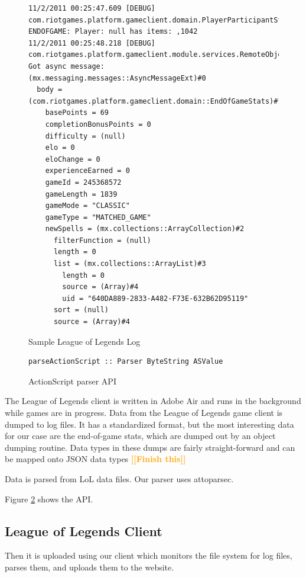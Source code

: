 \documentclass{chi2009}
\newcommand{\todo}[1]{\textsf{\textbf{\textcolor{Orange}{[[#1]]}}}}
\begin{document}
\begin{figure}[]
\begin{verbatim}
11/2/2011 00:25:47.609 [DEBUG] com.riotgames.platform.gameclient.domain.PlayerParticipantStatsSummary ENDOFGAME: Player: null has items: ,1042
11/2/2011 00:25:48.218 [DEBUG] com.riotgames.platform.gameclient.module.services.RemoteObjectGenerator Got async message: (mx.messaging.messages::AsyncMessageExt)#0
  body = (com.riotgames.platform.gameclient.domain::EndOfGameStats)#1
    basePoints = 69
    completionBonusPoints = 0
    difficulty = (null)
    elo = 0
    eloChange = 0
    experienceEarned = 0
    gameId = 245368572
    gameLength = 1839
    gameMode = "CLASSIC"
    gameType = "MATCHED_GAME"
    newSpells = (mx.collections::ArrayCollection)#2
      filterFunction = (null)
      length = 0
      list = (mx.collections::ArrayList)#3
        length = 0
        source = (Array)#4
        uid = "640DA889-2833-A482-F73E-632B62D95119"
      sort = (null)
      source = (Array)#4
\end{verbatim}
    \caption{Sample League of Legends Log}
    \label{samplelog}
\end{figure}

\begin{figure}[]
\begin{verbatim}
parseActionScript :: Parser ByteString ASValue
\end{verbatim}
    \caption{ActionScript parser API}
    \label{asapi}
\end{figure}

The League of Legends client is written in Adobe Air and runs in the background while games are in progress. Data from the League of Legends game client is dumped to log files.  It has a standardized format, but the most interesting data for our case are the end-of-game stats, which are dumped out by an object dumping routine.  Data types in these dumps are fairly straight-forward and can be mapped onto JSON data types \todo{Finish this}

Data is parsed from LoL data files. Our parser uses attoparsec.

Figure \ref{asapi} shows the API.

\subsection{League of Legends Client}

Then it is uploaded using our client which monitors the file system for log files, parses them, and uploads them to the website. 
\end{document}
